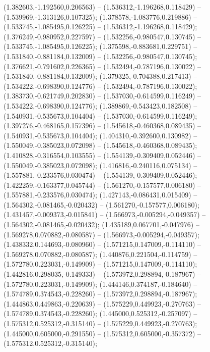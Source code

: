  (1.382603,-1.192560,0.206563) -- (1.536312,-1.196268,0.118429) -- (1.539969,-1.313126,0.107325);
 (1.378578,-1.083776,0.219886) -- (1.533745,-1.085495,0.126225) -- (1.536312,-1.196268,0.118429);
 (1.376249,-0.980952,0.227597) -- (1.532256,-0.980547,0.130745) -- (1.533745,-1.085495,0.126225);
 (1.375598,-0.883681,0.229751) -- (1.531840,-0.881184,0.132009) -- (1.532256,-0.980547,0.130745);
 (1.376621,-0.791602,0.226365) -- (1.532494,-0.787196,0.130022) -- (1.531840,-0.881184,0.132009);
 (1.379325,-0.704388,0.217413) -- (1.534222,-0.698390,0.124776) -- (1.532494,-0.787196,0.130022);
 (1.383730,-0.621749,0.202830) -- (1.537030,-0.614599,0.116249) -- (1.534222,-0.698390,0.124776);
 (1.389869,-0.543423,0.182508) -- (1.540931,-0.535673,0.104404) -- (1.537030,-0.614599,0.116249);
 (1.397276,-0.468165,0.157396) -- (1.545618,-0.460368,0.089435) -- (1.540931,-0.535673,0.104404);
 (1.404310,-0.392600,0.130982) -- (1.550049,-0.385023,0.072098) -- (1.545618,-0.460368,0.089435);
 (1.410828,-0.316554,0.103555) -- (1.554139,-0.309409,0.052446) -- (1.550049,-0.385023,0.072098);
 (1.416816,-0.240116,0.075134) -- (1.557881,-0.233576,0.030474) -- (1.554139,-0.309409,0.052446);
 (1.422259,-0.163377,0.045744) -- (1.561270,-0.157577,0.006180) -- (1.557881,-0.233576,0.030474);
 (1.427143,-0.086431,0.015409) -- (1.564302,-0.081465,-0.020432) -- (1.561270,-0.157577,0.006180);
 (1.431457,-0.009373,-0.015841) -- (1.566973,-0.005294,-0.049357) -- (1.564302,-0.081465,-0.020432);
 (1.435189,0.067701,-0.047976) -- (1.569278,0.070882,-0.080587) -- (1.566973,-0.005294,-0.049357);
 (1.438332,0.144693,-0.080960) -- (1.571215,0.147009,-0.114110) -- (1.569278,0.070882,-0.080587);
 (1.440876,0.221504,-0.114759) -- (1.572780,0.223031,-0.149909) -- (1.571215,0.147009,-0.114110);
 (1.442816,0.298035,-0.149333) -- (1.573972,0.298894,-0.187967) -- (1.572780,0.223031,-0.149909);
 (1.444146,0.374187,-0.184640) -- (1.574789,0.374543,-0.228260) -- (1.573972,0.298894,-0.187967);
 (1.444863,0.449863,-0.220639) -- (1.575229,0.449923,-0.270763) -- (1.574789,0.374543,-0.228260);
 (1.445000,0.525312,-0.257097) -- (1.575312,0.525312,-0.315140) -- (1.575229,0.449923,-0.270763);
 (1.445000,0.605000,-0.291550) -- (1.575312,0.605000,-0.357372) -- (1.575312,0.525312,-0.315140);
